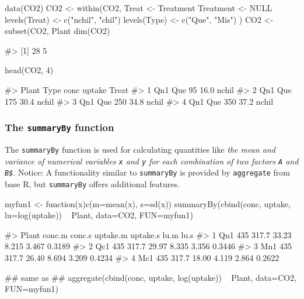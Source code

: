 \begin{Schunk}
\begin{Sinput}
data(CO2)
CO2 <- within(CO2, {
    Treat <- Treatment
    Treatment <- NULL
    levels(Treat) <- c("nchil", "chil")
    levels(Type)  <- c("Que", "Mis")
})
CO2 <- subset(CO2, Plant %in% c("Qn1", "Qc1", "Mn1", "Mc1"))
dim(CO2)
\end{Sinput}
\begin{Soutput}
#> [1] 28  5
\end{Soutput}
\begin{Sinput}
head(CO2, 4)
\end{Sinput}
\begin{Soutput}
#>   Plant Type conc uptake Treat
#> 1   Qn1  Que   95   16.0 nchil
#> 2   Qn1  Que  175   30.4 nchil
#> 3   Qn1  Que  250   34.8 nchil
#> 4   Qn1  Que  350   37.2 nchil
\end{Soutput}
\end{Schunk}

\hypertarget{the-summaryby-function}{%
\subsubsection{\texorpdfstring{The \texttt{summaryBy}
function}{The summaryBy function}}\label{the-summaryby-function}}

The \texttt{summaryBy} function is used for calculating quantities like
\emph{the mean and variance of numerical variables \texttt{x} and
\texttt{y} for each combination of two factors \texttt{A} and
\texttt{B\$}}. Notice: A functionality similar to \texttt{summaryBy} is
provided by \texttt{aggregate} from base R, but \texttt{summaryBy}
offers additional features.

\begin{Schunk}
\begin{Sinput}
myfun1 <- function(x){c(m=mean(x), s=sd(x))}
summaryBy(cbind(conc, uptake, lu=log(uptake)) ~ Plant, data=CO2, FUN=myfun1)
\end{Sinput}
\begin{Soutput}
#>   Plant conc.m conc.s uptake.m uptake.s  lu.m   lu.s
#> 1   Qn1    435  317.7    33.23    8.215 3.467 0.3189
#> 2   Qc1    435  317.7    29.97    8.335 3.356 0.3446
#> 3   Mn1    435  317.7    26.40    8.694 3.209 0.4234
#> 4   Mc1    435  317.7    18.00    4.119 2.864 0.2622
\end{Soutput}
\begin{Sinput}
## same as
## aggregate(cbind(conc, uptake, log(uptake)) ~ Plant, data=CO2, FUN=myfun1)
\end{Sinput}
\end{Schunk}

